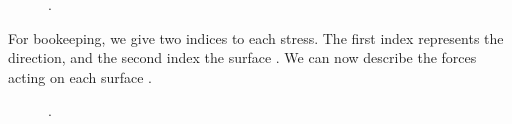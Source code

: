 \begin{figure}
  \begin{center}
  \end{center}
  \caption[]{.}
  \label{fig:tensor9}
\end{figure}

For bookeeping, we give two indices to each stress. The first index
represents the direction, and the second index the surface
. We can now describe the forces acting on each surface .

\begin{figure}
  \begin{center}
  \end{center}
  \caption[]{.}
  \label{fig:tensor10}
\end{figure}

